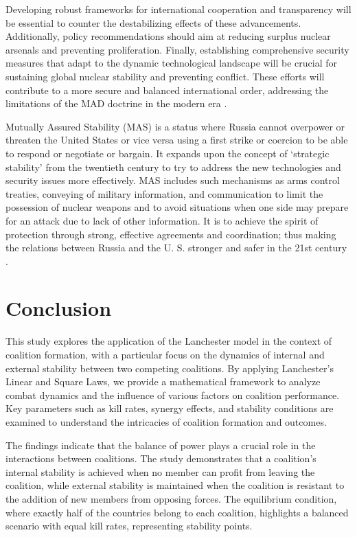 \documentclass[oneside,12pt]{report}
\begin{document}
Developing robust frameworks for international cooperation and transparency will be essential to counter the destabilizing effects of these advancements. Additionally, policy recommendations should aim at reducing surplus nuclear arsenals and preventing proliferation. Finally, establishing comprehensive security measures that adapt to the dynamic technological landscape will be crucial for sustaining global nuclear stability and preventing conflict. These efforts will contribute to a more secure and balanced international order, addressing the limitations of the MAD doctrine in the modern era\cite{r4} .

Mutually Assured Stability (MAS) is a status where Russia cannot overpower or threaten the United States or vice versa using a first strike or coercion to be able to respond or negotiate or bargain. It expands upon the concept of ‘strategic stability’ from the twentieth century to try to address the new technologies and security issues more effectively. MAS includes such mechanisms as arms control treaties, conveying of military information, and communication to limit the possession of nuclear weapons and to avoid situations when one side may prepare for an attack due to lack of other information. It is to achieve the spirit of protection through strong, effective agreements and coordination; thus making the relations between Russia and the U. S. stronger and safer in the 21st century \cite{r9}.

\chapter{Conclusion}

This study explores the application of the Lanchester model in the context of coalition formation, with a particular focus on the dynamics of internal and external stability between two competing coalitions. By applying Lanchester's Linear and Square Laws, we provide a mathematical framework to analyze combat dynamics and the influence of various factors on coalition performance. Key parameters such as kill rates, synergy effects, and stability conditions are examined to understand the intricacies of coalition formation and outcomes.

The findings indicate that the balance of power plays a crucial role in the interactions between coalitions. The study demonstrates that a coalition's internal stability is achieved when no member can profit from leaving the coalition, while external stability is maintained when the coalition is resistant to the addition of new members from opposing forces. The equilibrium condition, where exactly half of the countries belong to each coalition, highlights a balanced scenario with equal kill rates, representing stability points.
\end{document}
